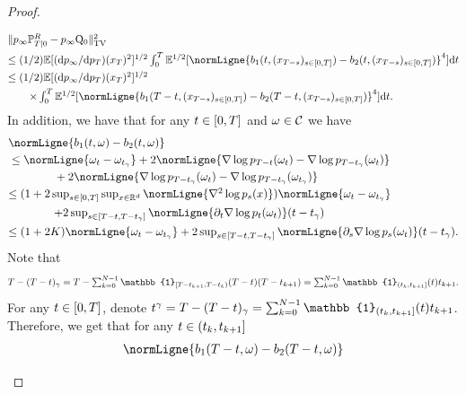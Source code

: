 \begin{proof}
\begin{enumerate}[wide, labelwidth=!, labelindent=0pt, label=(\alph*)]
\begin{align}
        &\textstyle{
          \tvnormLigne{p_\infty \Pbb^R_{T|0} - p_\infty \Qker_0}^2}  \\
        &\textstyle{\leq (1/2) \expeLigne{(\rmd p_\infty / \rmd
          p_T)(x_T)^2}^{1/2} \int_0^T \expeLignesqrt{\normLigne{b_1(t, (x_{T-s})_{s \in \ccint{0,T}}) - b_2(t, (x_{T-s})_{s \in \ccint{0,T}})}^4} \rmd t }  \\
        & \textstyle{\leq (1/2) \expeLigne{(\rmd p_\infty / \rmd
          p_T)(x_T)^2}^{1/2}  }\\
        & \qquad \textstyle{\times \int_0^T \expeLignesqrt{\normLigne{b_1(T-t, (x_{T-s})_{s \in \ccint{0,T}}) - b_2(T-t, (x_{T-s})_{s \in \ccint{0,T}})}^4} \rmd t }  . 
      \end{align}
In addition, we have that for any $t \in \left[0,T\right]$ and $\omega \in \mathcal{C}$ we have
\begin{align}
  &\normLigne{b_1(t, \omega)  - b_2(t, \omega)} \\
  & \leq \normLigne{\omega_t - \omega_{t_\gamma}} + 2 \normLigne{\nabla \log p_{T-t}(\omega_t) - \nabla \log p_{T-t_\gamma}(\omega_t)} \\
  & \qquad \qquad + 2 \normLigne{\nabla \log p_{T-t_\gamma}(\omega_t) - \nabla \log p_{T-t_\gamma}(\omega_{t_\gamma})} \\
  &  \textstyle{\leq (1 + 2\sup_{s \in \ccint{0,T}} \sup_{x \in \rset^d}\normLigne{\nabla^2 \log p_s(x)})} \normLigne{\omega_t - \omega_{t_\gamma}} \\
  & \qquad \qquad \textstyle{+ 2 \sup_{s \in \ccint{T-t, T- t_{\gamma}}} \normLigne{\partial_t \nabla \log p_t(\omega_t)}(t - t_\gamma)} \\
&  \textstyle{\leq (1 + 2\Ktt) \normLigne{\omega_t - \omega_{t_\gamma}} + 2 \sup_{s \in \ccint{T-t, T- t_{\gamma}}} \normLigne{\partial_s \nabla \log p_s(\omega_t)} (t - t_\gamma)  }  . 
\end{align}
Note that
\begin{equation}
  \textstyle{
  T - (T - t)_\gamma = T - \sum_{k=0}^{N-1} \mathbb{1}_{\coint{T - t_{k+1}, T -
          t_{k}}}(T - t) (T - t_{k+1}) = \sum_{k=0}^{N-1} \mathbb{1}_{\ocint{t_k,t_{k+1}}}(t) t_{k+1}  . }
\end{equation}
For any $t \in \left[0,T\right]$, denote
$t^\gamma = T - (T - t)_\gamma = \sum_{k=0}^{N-1}
\mathbb{1}_{\ocint{t_k,t_{k+1}}}(t) t_{k+1}$. Therefore, we get that for any
$t \in \left(t_k,t_{k+1}\right]$
\begin{align}
  &\normLigne{b_1(T-t, \omega)  - b_2(T-t, \omega)} \\

\end{align}
\end{enumerate}
\end{proof}
